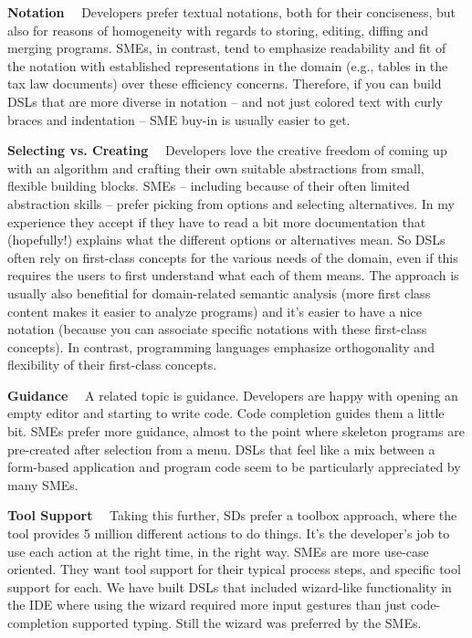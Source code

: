\documentclass[runningheads]{llncs}
\newcommand\parhead[1]{\vspace{1mm}\noindent\textbf{{#1}}\ \ }
\begin{document}
\parhead{Notation} Developers prefer textual notations, both for their
conciseness, but also for reasons of homogeneity with regards to storing,
editing, diffing and merging programs. SMEs, in contrast, tend to emphasize
readability and fit of the notation with established representations in the
domain (e.g., tables in the tax law documents) over these efficiency concerns.
Therefore, if you can build DSLs that are more diverse in notation -- and not
just colored text with curly braces and indentation -- SME buy-in is usually
easier to get.

\parhead{Selecting vs. Creating} Developers love the creative freedom of coming
up with an algorithm and crafting their own suitable abstractions from small,
flexible building blocks. SMEs -- including because of their often limited
abstraction skills -- prefer picking from options and selecting alternatives.
In my experience they accept if they have to read a bit more documentation that
(hopefully!) explains what the different options or alternatives mean.
So DSLs often rely on first-class concepts for the various needs of the domain,
even if this requires the users to first understand what each of them means.
The approach is usually also benefitial for domain-related semantic analysis
(more first class content makes it easier to analyze programs) and it's easier
to have a nice notation (because you can associate specific notations with these
first-class concepts). In contrast, programming languages emphasize
orthogonality and flexibility of their first-class concepts.

\parhead{Guidance} A related topic is guidance. Developers are happy with
opening an empty editor and starting to write code. Code completion guides
them a little bit. SMEs prefer more guidance, almost to the point where 
skeleton programs are pre-created after selection from a menu. DSLs that feel
like a mix between a form-based application and program code seem to be 
particularly appreciated by many SMEs. 

\parhead{Tool Support} Taking this further, SDs prefer a toolbox approach, where
the tool provides 5 million different actions to do things. It's the
developer's job to use each action at the right time, in the right way.
SMEs are more use-case oriented. They want tool support for their typical
process steps, and specific tool support for each. We have built DSLs that
included wizard-like functionality in the IDE where using the wizard required
more input gestures than just code-completion supported typing. Still the wizard
was preferred by the SMEs.
 
\end{document}
